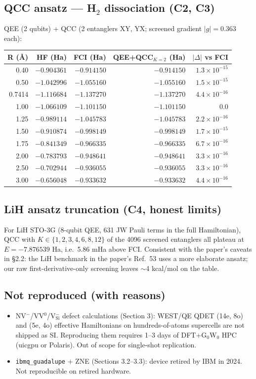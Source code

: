 \documentclass[11pt]{article}
\begin{document}
\subsection*{QCC ansatz --- H$_2$ dissociation (C2, C3)}
QEE (2 qubits) + QCC (2 entanglers XY, YX; screened gradient $|g|=0.363$ each):
\begin{tabular}{rrrrr}
\toprule
R (\AA) & HF (Ha) & FCI (Ha) & QEE+QCC$_{K=2}$ (Ha) & $|\Delta|$ vs FCI \\
\midrule
0.40   & $-0.904361$ & $-0.914150$ & $-0.914150$ & $1.3\times10^{-15}$ \\
0.50   & $-1.042996$ & $-1.055160$ & $-1.055160$ & $1.5\times10^{-15}$ \\
0.7414 & $-1.116684$ & $-1.137270$ & $-1.137270$ & $4.4\times10^{-16}$ \\
1.00   & $-1.066109$ & $-1.101150$ & $-1.101150$ & $0.0$ \\
1.25   & $-0.989114$ & $-1.045783$ & $-1.045783$ & $2.2\times10^{-16}$ \\
1.50   & $-0.910874$ & $-0.998149$ & $-0.998149$ & $1.7\times10^{-15}$ \\
1.75   & $-0.841349$ & $-0.966335$ & $-0.966335$ & $6.7\times10^{-16}$ \\
2.00   & $-0.783793$ & $-0.948641$ & $-0.948641$ & $3.3\times10^{-16}$ \\
2.50   & $-0.702944$ & $-0.936055$ & $-0.936055$ & $3.3\times10^{-16}$ \\
3.00   & $-0.656048$ & $-0.933632$ & $-0.933632$ & $4.4\times10^{-16}$ \\
\bottomrule
\end{tabular}

\subsection*{LiH ansatz truncation (C4, honest limits)}
For LiH STO-3G (8-qubit QEE, 631 JW Pauli terms in the full Hamiltonian), QCC with $K \in \{1,2,3,4,6,8,12\}$ of the 4096 screened entanglers all plateau at $E=-7.876539$ Ha, i.e.\ 5.86 mHa above FCI. Consistent with the paper's caveats in \S2.2: the LiH benchmark in the paper's Ref.\ 53 uses a more elaborate ansatz; our raw first-derivative-only screening leaves $\sim$4 kcal/mol on the table.

\subsection*{Not reproduced (with reasons)}
\begin{itemize}\itemsep0.1em
\item NV$^-$/VV$^0$/V$^-_{\text{Si}}$ defect calculations (Section 3): WEST/QE QDET (14e, 8o) and (5e, 4o) effective Hamiltonians on hundreds-of-atoms supercells are not shipped as SI. Reproducing them requires 1--3 days of DFT+G$_0$W$_0$ HPC (uicgpu or Polaris). Out of scope for single-shot replication.
\item \texttt{ibmq\_guadalupe} + ZNE (Sections 3.2--3.3): device retired by IBM in 2024. Not reproducible on retired hardware.
\end{itemize}
\end{document}
